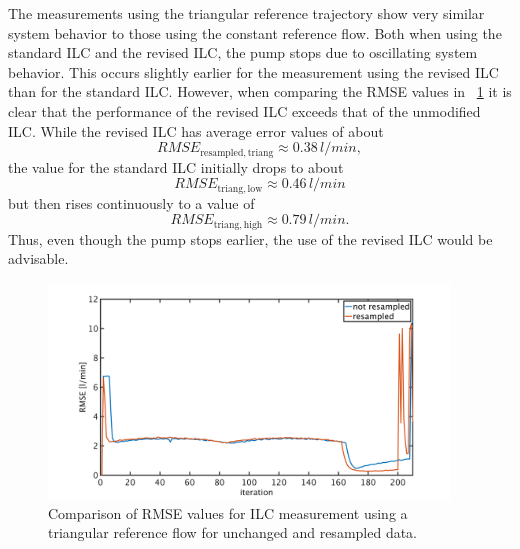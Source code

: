 \newpage
The measurements using the triangular reference trajectory show very similar system behavior to those using the constant reference flow.
Both when using the standard ILC and the revised ILC, the pump stops due to oscillating system behavior. This occurs slightly earlier for the measurement using the revised ILC than for the standard ILC. However, when comparing the RMSE values in \figurename~\ref{fig:RMSE_ilc_var_dist_comp_triang} it is clear that the performance of the revised ILC exceeds that of the unmodified ILC. While the revised ILC has average error values of about
\begin{equation}
  RMSE_{\mathrm{resampled,triang}}\approx0.38\,l/min,
\end{equation}
the value for the standard ILC initially drops to about
\begin{equation}
  RMSE_{\mathrm{triang,low}}\approx0.46\,l/min
\end{equation}
but then rises continuously to a value of
\begin{equation}
  RMSE_{\mathrm{triang,high}}\approx0.79\,l/min.
\end{equation}
Thus, even though the pump stops earlier, the use of the revised ILC would be advisable.

\begin{figure}[ht!]
  \centering
  \includegraphics[width=0.95\textwidth]{images/chapt_5/ILC/RMSE_ilc_var_dist_comp_triang.pdf}
  \caption[Comparison of RMSE values for ILC measurement using a triangular reference flow for unchanged and resampled data]{Comparison of RMSE values for ILC measurement using a triangular reference flow for unchanged and resampled data.}
  \label{fig:RMSE_ilc_var_dist_comp_triang}
\end{figure}

